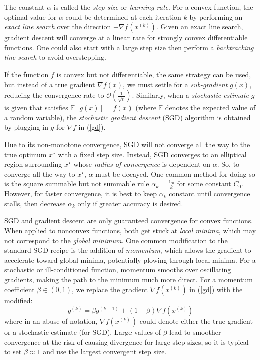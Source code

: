 \documentclass[12pt]{article}
\begin{document}
The constant $\alpha$ is called the {\it step size} or {\it learning rate}.
For a convex function, the optimal value for $\alpha$ 
could be determined at each iteration $k$ by performing an 
{\it exact line search} over the direction $-\nabla f(x^{(k)})$.
Given an exact line search, gradient descent will converge at a linear
rate for strongly convex differentiable functions.
One could also start with a large step size then perform a 
{\it backtracking line search} to avoid overstepping.

If the function $f$ is convex but not differentiable, the same
strategy can be used, but instead of a true gradient $\nabla f(x)$,
we must settle for a {\it sub-gradient} $g(x)$, reducing the convergence 
rate to 
$\mathcal{O}\left(\frac{1}{\sqrt{t}}\right)$.
Similarly, when a {\it stochastic estimate} $g$ is given that satisfies 
$\mathbb{E}\left[g(x)\right] = f(x)$
(where $\mathbb{E}$ denotes the expected value of a random
variable), the {\it stochastic gradient descent} (SGD) algorithm is obtained
by plugging in $g$ for $\nabla f$ in (\ref{gd}).

Due to its non-monotone convergence, SGD will not converge all the
way to the true optimum $x^\star$ with a fixed step size.
Instead, SGD converges to an elliptical region surrounding
$x^\star$ whose {\it radius of convergence} is dependent on $\alpha$.
So, to converge all the way to $x^\star$, $\alpha$ must be decayed.
One common method for doing so is the square summable but not
summable rule $\alpha_k = \frac{C_0}{k}$ for some constant $C_0$.
However, for faster convergence, it is best to keep $\alpha_k$ constant
until convergence stalls, then decrease $\alpha_k$ only if greater accuracy is 
desired.

SGD and gradient descent are only guaranteed convergence for convex functions.
When applied to nonconvex functions, both get stuck at {\it local minima}, 
which may not correspond to the {\it global minimum}.
One common modification to the standard SGD recipe is the addition of 
{\it momentum}, which allows the gradient to accelerate toward 
global minima, potentially plowing through local minima.
For a stochastic or ill-conditioned function, momentum smooths over oscillating 
gradients, making the path to the minimum much more direct.
For a momentum coefficient $\beta \in (0,1)$, we replace the gradient 
$\nabla f(x^{(k)})$ in (\ref{gd}) with the modified:
$$
g^{(k)} = \beta g^{(k-1)} + (1-\beta)\nabla f(x^{(k)})
$$
where in an abuse of notation, $\nabla f(x^{(k)})$ could denote
either the true gradient or a stochastic estimate (for SGD).
Large values of $\beta$ lead to smoother convergence at the risk of causing 
divergence for large step sizes, so it is typical to set $\beta \approx 1$ 
and use the largest convergent step size.
\end{document}
